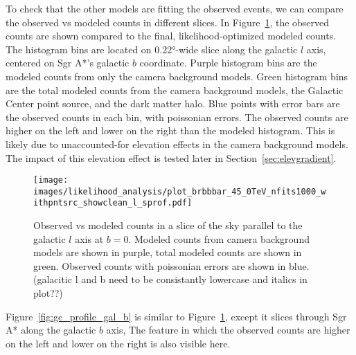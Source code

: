   To check that the other models are fitting the observed events, we can compare the observed vs modeled counts in different slices.
  In Figure~\ref{fig:gc_profile_gal_l}, the observed counts are shown compared to the final, likelihood-optimized modeled counts.
  The histogram bins are located on \ang{0.22}-wide slice along the galactic $l$ axis, centered on Sgr A*'s galactic $b$ coordinate.
  Purple histogram bins are the modeled counts from only the camera background models.
  Green histogram bins are the total modeled counts from the camera background models, the Galactic Center point source, and the dark matter halo.
  Blue points with error bars are the observed counts in each bin, with poissonian errors.
  The observed counts are higher on the left and lower on the right than the modeled histogram.
  This is likely due to unaccounted-for elevation effects in the camera background models.
  The impact of this elevation effect is tested later in Section~\ref{sec:elevgradient}.
  
  \begin{figure}[h]
    \centering
    \texttt{[image: images/likelihood\_analysis/plot\_brbbbar\_45\_0TeV\_nfits1000\_withpntsrc\_showclean\_l\_sprof.pdf]}
    \caption[Galactic Center Profile vs Galactic $l$]{
      Observed vs modeled counts in a slice of the sky parallel to the galactic $l$ axis at $b=0$.
      Modeled counts from camera background models are shown in purple, total modeled counts are shown in green.
      Observed counts with poissonian errors are shown in blue.
      {\color{red}(galacitic l and b need to be consistantly lowercase and italics in plot??)}
    }
    \label{fig:gc_profile_gal_l}
  \end{figure}

  Figure~\ref{fig:gc_profile_gal_b} is similar to Figure~\ref{fig:gc_profile_gal_l}, except it slices through Sgr A* along the galactic $b$ axis,
  The feature in which the observed counts are higher on the left and lower on the right is also visible here.

